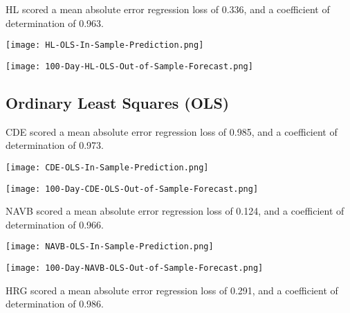 HL scored a mean absolute error regression loss of 0.336, and a coefficient of determination of 0.963.

\begin{center}  
    \texttt{[image: HL-OLS-In-Sample-Prediction.png]}
    \label{fig:nonfloat}
\end{center}

\begin{center}
    \texttt{[image: 100-Day-HL-OLS-Out-of-Sample-Forecast.png]}
    \label{fig:nonfloat}
\end{center}

\subsection{Ordinary Least Squares (OLS)}
CDE scored a mean absolute error regression loss of 0.985, and a coefficient of determination of 0.973.

\begin{center}
    \texttt{[image: CDE-OLS-In-Sample-Prediction.png]}
    \label{fig:nonfloat}
\end{center}

\begin{center}
    \texttt{[image: 100-Day-CDE-OLS-Out-of-Sample-Forecast.png]}
    \label{fig:nonfloat}
\end{center}

NAVB scored a mean absolute error regression loss of 0.124, and a coefficient of determination of 0.966.

\begin{center}  
    \texttt{[image: NAVB-OLS-In-Sample-Prediction.png]}
    \label{fig:nonfloat}
\end{center}

\begin{center}
  
    \texttt{[image: 100-Day-NAVB-OLS-Out-of-Sample-Forecast.png]}
    \label{fig:nonfloat}
\end{center}

HRG scored a mean absolute error regression loss of 0.291, and a coefficient of determination of 0.986.

